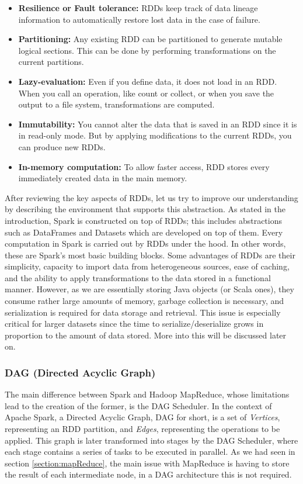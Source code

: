 \begin{itemize}
    \itemsep0.25em
    \item \textbf{Resilience or Fault tolerance:} RDDs keep track of data lineage information to automatically restore lost data in the case of failure.
    \item \textbf{Partitioning:} Any existing RDD can be partitioned to generate mutable logical sections. This can be done by performing transformations on the current partitions.
    \item \textbf{Lazy-evaluation:} Even if you define data, it does not load in an RDD. When you call an operation, like count or collect, or when you save the output to a file system, transformations are computed.
    \item \textbf{Immutability:} You cannot alter the data that is saved in an RDD since it is in read-only mode. But by applying modifications to the current RDDs, you can produce new RDDs.
    \item \textbf{In-memory computation:} To allow faster access, RDD stores every immediately created data in the main memory.
\end{itemize}

After reviewing the key aspects of RDDs, let us try to improve our understanding by describing the environment that supports this abstraction. As stated in the introduction, Spark is constructed on top of RDDs; this includes abstractions such as DataFrames and Datasets which are developed on top of them.  Every computation in Spark is carried out by RDDs under the hood. In other words, these are Spark's most basic building blocks. Some advantages of RDDs are their simplicity, capacity to import data from heterogeneous sources, ease of caching, and the ability to apply transformations to the data stored in a functional manner. However, as we are essentially storing Java objects (or Scala ones), they consume rather large amounts of memory, garbage collection is necessary, and serialization is required for data storage and retrieval. This issue is especially critical for larger datasets since the time to serialize/deserialize grows in proportion to the amount of data stored. More into this will be discussed later on.

\subsubsection{DAG (Directed Acyclic Graph)}

The main difference between Spark and Hadoop MapReduce, whose limitations lead to the creation of the former, is the DAG Scheduler. In the context of Apache Spark, a Directed Acyclic Graph, DAG for short, is a set of \textit{Vertices}, representing an RDD partition, and \textit{Edges}, representing the operations to be applied. This graph is later transformed into stages by the DAG Scheduler, where each stage contains a series of tasks to be executed in parallel. As we had seen in section \ref{section:mapReduce}, the main issue with MapReduce is having to store the result of each intermediate node, in a DAG architecture this is not required.

